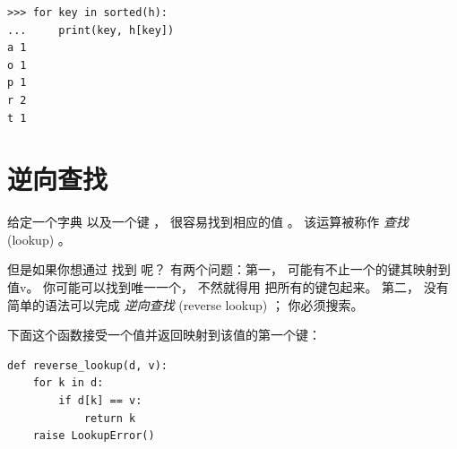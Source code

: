 \begin{lstlisting}
>>> for key in sorted(h):
...     print(key, h[key])
a 1
o 1
p 1
r 2
t 1
\end{lstlisting}



\section{逆向查找}
\label{raise}

  
  


给定一个字典  以及一个键  ， 很容易找到相应的值  。
该运算被称作 {\em 查找} (lookup) 。


但是如果你想通过  找到  呢？
有两个问题：第一， 可能有不止一个的键其映射到值v。
你可能可以找到唯一一个， 不然就得用  把所有的键包起来。
第二， 没有简单的语法可以完成 {\em 逆向查找} (reverse lookup) ； 你必须搜索。


下面这个函数接受一个值并返回映射到该值的第一个键：

\begin{lstlisting}
def reverse_lookup(d, v):
    for k in d:
        if d[k] == v:
            return k
    raise LookupError()
\end{lstlisting}

%

